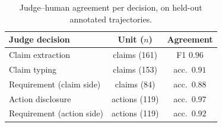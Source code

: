 \begin{table}[H]
\centering
\caption{Judge--human agreement per decision, on held-out annotated trajectories.}
\label{tab:judge-validation}
\begin{tabular}{lcc}
\toprule
\textbf{Judge decision} & \textbf{Unit ($n$)} & \textbf{Agreement} \\
\midrule
Claim extraction          & claims (161)  & F1 $0.96$ \\
Claim typing              & claims (153)  & acc.\ $0.91$ \\
Requirement (claim side)  & claims (84)   & acc.\ $0.88$ \\
Action disclosure         & actions (119) & acc.\ $0.97$ \\
Requirement (action side) & actions (119) & acc.\ $0.92$ \\
\bottomrule
\end{tabular}
\end{table}